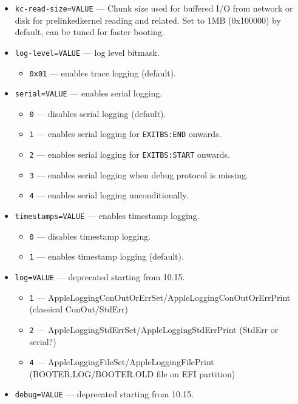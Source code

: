 \documentclass[]{article}
\begin{document}
\begin{itemize}
\begin{itemize}
\begin{itemize}
    \end{itemize}
  \item \texttt{kc-read-size=VALUE} --- Chunk size used for buffered I/O from network or
    disk for prelinkedkernel reading and related. Set to 1MB (0x100000) by default, can be
    tuned for faster booting.
  \item \texttt{log-level=VALUE} --- log level bitmask.
    \begin{itemize}
    \item \texttt{0x01} --- enables trace logging (default).
    \end{itemize}
  \item \texttt{serial=VALUE} --- enables serial logging.
    \begin{itemize}
    \item \texttt{0} --- disables serial logging (default).
    \item \texttt{1} --- enables serial logging for \texttt{EXITBS:END} onwards.
    \item \texttt{2} --- enables serial logging for \texttt{EXITBS:START} onwards.
    \item \texttt{3} --- enables serial logging when debug protocol is missing.
    \item \texttt{4} --- enables serial logging unconditionally.
    \end{itemize}
  \item \texttt{timestamps=VALUE} --- enables timestamp logging.
    \begin{itemize}
    \item \texttt{0} --- disables timestamp logging.
    \item \texttt{1} --- enables timestamp logging (default).
    \end{itemize}
  \item \texttt{log=VALUE} --- deprecated starting from 10.15.
    \begin{itemize}
    \item \texttt{1} --- AppleLoggingConOutOrErrSet/AppleLoggingConOutOrErrPrint
    (classical ConOut/StdErr)
    \item \texttt{2} --- AppleLoggingStdErrSet/AppleLoggingStdErrPrint (StdErr or serial?)
    \item \texttt{4} --- AppleLoggingFileSet/AppleLoggingFilePrint (BOOTER.LOG/BOOTER.OLD
    file on EFI partition)
    \end{itemize}
  \item \texttt{debug=VALUE} --- deprecated starting from 10.15.
  \begin{itemize}

\end{itemize}
\end{itemize}
\end{itemize}
\end{document}
